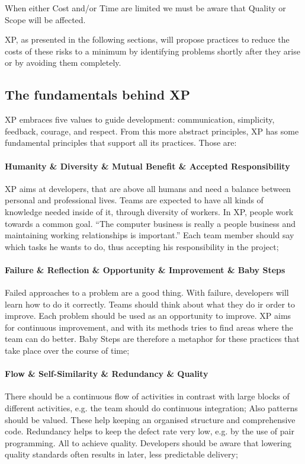\documentclass[conference]{IEEEtran}
\begin{document}
When either Cost and/or Time are limited we must be aware that Quality or Scope will be affected.

XP, as presented in the following sections, will propose practices to reduce the costs of these risks to a minimum by identifying problems shortly after they arise or by avoiding them completely. 

\subsection{The fundamentals behind XP}
XP embraces five values to guide development: communication, simplicity, feedback, courage, and respect. From this more abstract principles, XP has some fundamental principles that support all its practices. Those are:
\paragraph{Humanity \& Diversity \& Mutual Benefit \& Accepted Responsibility} XP aims at developers, that are above all humans and need a balance between personal and professional lives. Teams are expected to have all kinds of knowledge needed inside of it, through diversity of workers. In XP, people work towards a common goal. ``The computer business is really a people business and maintaining working relationships is important.''\cite{Beck:2004tc} Each team member should say which tasks he wants to do, thus accepting his responsibility in the project;
\paragraph{Failure \& Reflection \& Opportunity \& Improvement \& Baby Steps} Failed approaches to a problem are a good thing. With failure, developers will learn how to do it correctly. Teams should think about what they do ir order to improve. Each problem should be used as an opportunity to improve.  XP aims for continuous improvement, and with its methods tries to find areas where the team can do better. Baby Steps are therefore a metaphor for these practices that take place over the course of time;
\paragraph{Flow \& Self-Similarity \& Redundancy \& Quality} There should be a continuous flow of activities in contrast with large blocks of different activities, e.g. the team should do continuous integration; Also patterns should be valued. These help keeping an organised structure and comprehensive code. Redundancy helps to keep the defect rate very low, e.g. by the use of pair programming. All to achieve quality. Developers should be aware that lowering quality standards often results in later, less predictable delivery;
\end{document}
